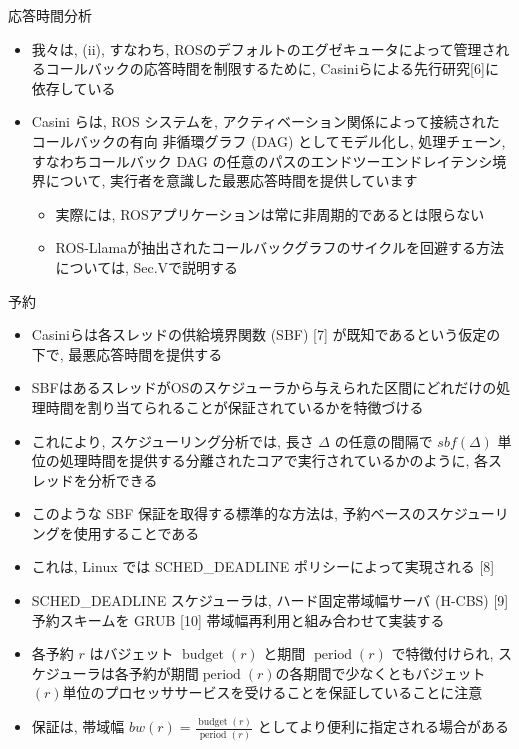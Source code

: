 \begin{frame}{応答時間分析}
    \begin{itemize}
        \item 我々は, (ii), すなわち, ROSのデフォルトのエグゼキュータによって管理されるコールバックの応答時間を制限するために, Casiniらによる先行研究[6]に依存している
        \item Casini らは, ROS システムを, アクティベーション関係によって接続されたコールバックの有向 非循環グラフ (DAG) としてモデル化し, 処理チェーン, すなわちコールバック DAG の任意のパスのエンドツーエンドレイテンシ境界について, 実行者を意識した最悪応答時間を提供しています
        \begin{itemize}
            \item 実際には, ROSアプリケーションは常に非周期的であるとは限らない
            \item ROS-Llamaが抽出されたコールバックグラフのサイクルを回避する方法については, Sec.Vで説明する
        \end{itemize}
    \end{itemize}
\end{frame}

\begin{frame}{予約}
    \begin{itemize}
        \item Casiniらは各スレッドの供給境界関数 (SBF) [7] が既知であるという仮定の下で, 最悪応答時間を提供する
        \item SBFはあるスレッドがOSのスケジューラから与えられた区間にどれだけの処理時間を割り当てられることが保証されているかを特徴づける
        \item これにより, スケジューリング分析では, 長さ $\Delta$ の任意の間隔で $s b f(\Delta)$ 単位の処理時間を提供する分離されたコアで実行されているかのように, 各スレッドを分析できる
        \item このような SBF 保証を取得する標準的な方法は, 予約ベースのスケジューリングを使用することである
        \item これは, Linux では SCHED\_DEADLINE ポリシーによって実現される [8]
    \end{itemize}
\end{frame}

\begin{frame}{}
    \begin{itemize}
        \item SCHED\_DEADLINE スケジューラは, ハード固定帯域幅サーバ (H-CBS) [9] 予約スキームを GRUB [10] 帯域幅再利用と組み合わせて実装する
        \item 各予約 $r$ はバジェット $\operatorname{budget}(r)$ と期間 $\operatorname{period}(r)$ で特徴付けられ, スケジューラは各予約が期間$\operatorname{period}(r)$の各期間で少なくともバジェット$(r)$単位のプロセッササービスを受けることを保証していることに注意
        \item 保証は, 帯域幅 $b w(r)=\frac{\operatorname{budget}(r)}{\text { period }(r)}$ としてより便利に指定される場合がある
    \end{itemize}
\end{frame}

